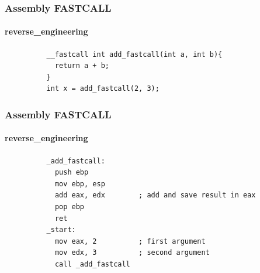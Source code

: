 \documentclass[aspectratio=169]{beamer}
\begin{document}
\begin{frame}[fragile]{}
  \frametitle{Assembly FASTCALL}
  \framesubtitle{reverse\_engineering}
  \begin{center}
    \begin{tcolorbox}[title=cdecl.c,colback=black]
        \begin{verbatim}
          __fastcall int add_fastcall(int a, int b){
            return a + b;
          }
          int x = add_fastcall(2, 3);
        \end{verbatim}
    \end{tcolorbox}
  \end{center}
\end{frame}

\begin{frame}[fragile]{}
  \frametitle{Assembly FASTCALL}
  \framesubtitle{reverse\_engineering}
  \begin{center}
    \begin{tcolorbox}[title=fastcall.asm,colback=black]
        \begin{verbatim}
          _add_fastcall:
            push ebp
            mov ebp, esp
            add eax, edx        ; add and save result in eax
            pop ebp
            ret
          _start:
            mov eax, 2          ; first argument
            mov edx, 3          ; second argument
            call _add_fastcall
        \end{verbatim}
    \end{tcolorbox}
  \end{center}
\end{frame}
\end{document}
